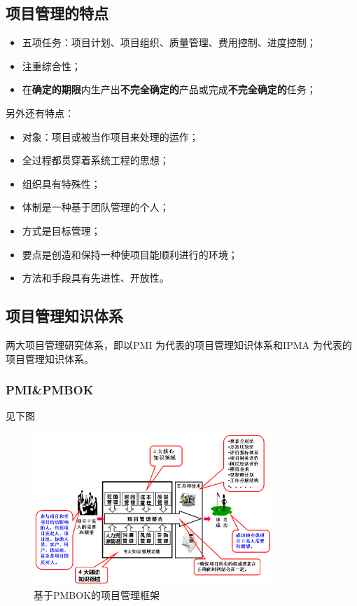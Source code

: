 \subsection{项目管理的特点}
\begin{itemize}
	\item 五项任务：项目计划、项目组织、质量管理、费用控制、进度控制；
	\item 注重综合性；
	\item 在\textbf{确定的期限}内生产出\textbf{不完全确定的}产品或完成\textbf{不完全确定的}任务；
\end{itemize}
另外还有特点：
\begin{itemize}
	\item 对象：项目或被当作项目来处理的运作；
	\item 全过程都贯穿着系统工程的思想；
	\item 组织具有特殊性；
	\item 体制是一种基于团队管理的个人；
	\item 方式是目标管理；
	\item 要点是创造和保持一种使项目能顺利进行的环境；
	\item 方法和手段具有先进性、开放性。
\end{itemize}
\subsection{项目管理知识体系}
两大项目管理研究体系，即以PMI 为代表的项目管理知识体系和IPMA 为代表的项目管理知识体系。
\subsubsection*{PMI\&PMBOK}
见下图
\begin{figure}[!h]
	\centering
	\includegraphics[width=0.8\textwidth]{image/1-1}
	\caption{基于PMBOK的项目管理框架}
\end{figure}
